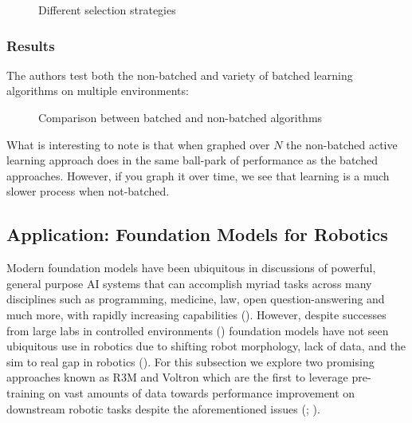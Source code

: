 \documentclass[
  letterpaper,
  numbers=noenddot,
  DIV=11]{scrreprt}
\theoremstyle{plain}
\theoremstyle{definition}
\theoremstyle{plain}
\theoremstyle{remark}
\begin{document}
\begin{figure}


\caption{\label{fig-selection-strategy}Different selection strategies}

\end{figure}%

\subsubsection*{Results}\label{results}

The authors test both the non-batched and variety of batched learning
algorithms on multiple environments:

\begin{figure}


\caption{\label{fig-batch-nonbatch}Comparison between batched and
non-batched algorithms}

\end{figure}%

What is interesting to note is that when graphed over \(N\) the
non-batched active learning approach does in the same ball-park of
performance as the batched approaches. However, if you graph it over
time, we see that learning is a much slower process when not-batched.

\subsection{Application: Foundation Models for
Robotics}\label{application-foundation-models-for-robotics}

Modern foundation models have been ubiquitous in discussions of
powerful, general purpose AI systems that can accomplish myriad tasks
across many disciplines such as programming, medicine, law, open
question-answering and much more, with rapidly increasing capabilities
().
However, despite successes from large labs in controlled environments
() foundation models
have not seen ubiquitous use in robotics due to shifting robot
morphology, lack of data, and the sim to real gap in robotics
(). For this
subsection we explore two promising approaches known as R3M and Voltron
which are the first to leverage pre-training on vast amounts of data
towards performance improvement on downstream robotic tasks despite the
aforementioned issues (;
).
\end{document}
